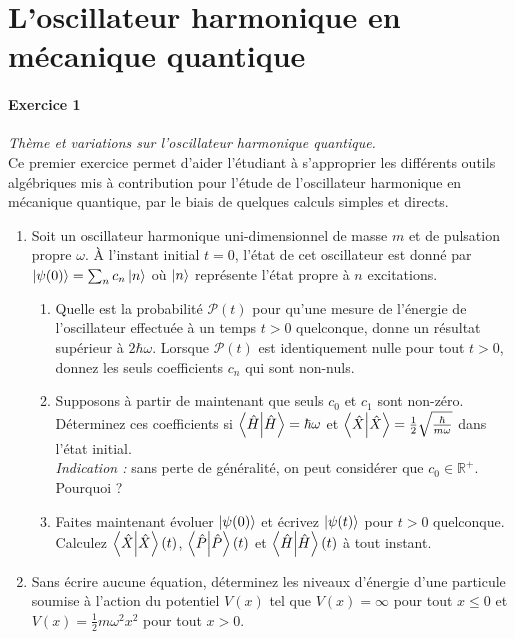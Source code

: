 \section{L'oscillateur harmonique en mécanique quantique}

\paragraph{Exercice 1} \textit{Thème et variations sur l'oscillateur harmonique quantique.} \\
Ce premier exercice permet d'aider l'étudiant à s'approprier les différents outils algébriques mis à contribution pour l'étude de l'oscillateur harmonique en mécanique quantique, par le biais de quelques calculs simples et directs.

\begin{enumerate}

\item Soit un oscillateur harmonique uni-dimensionnel de masse $m$ et de pulsation propre $\omega$. À l'instant initial $t=0$, l'état de cet oscillateur est donné par $\ket{\psi(0)} = \sum_n c_n \ket{n}$ où $\ket{n}$ représente l'état propre à $n$ excitations. 
	\begin{enumerate}
	\item Quelle est la probabilité $\mathcal P (t)$ pour qu'une mesure de l'énergie de l'oscillateur effectuée à un temps $t>0$ quelconque, donne un résultat supérieur à $2\hbar \omega$. Lorsque $\mathcal P(t)$ est identiquement nulle pour tout $t>0$, donnez les seuls coefficients $c_n$ qui sont non-nuls.
	\item Supposons à partir de maintenant que seuls $c_0$ et $c_1$ sont non-zéro. Déterminez ces coefficients si $\braket{\hat H} = \hbar \omega$ et $\braket{\hat X} = \frac{1}{2} \sqrt{\frac{\hbar}{m\omega}}$ dans l'état initial. \\
	\textit{Indication :} sans perte de généralité, on peut considérer que $c_0 \in \mathbb{R}^+$. Pourquoi ?
	\item Faites maintenant évoluer $\ket{\psi(0)}$ et écrivez $\ket{\psi(t)}$ pour $t>0$ quelconque. Calculez $\braket{\hat X}(t)$, $\braket{\hat P}(t)$ et $\braket{\hat H}(t)$ à tout instant. 
	\end{enumerate}

\item Sans écrire aucune équation, déterminez les niveaux d'énergie d'une particule soumise à l'action du potentiel $V(x)$ tel que $V(x) = \infty$ pour tout $x \leq 0$ et $V(x) = \frac{1}{2}m \omega^2 x^2$ pour tout $x>0$.


\end{enumerate}
